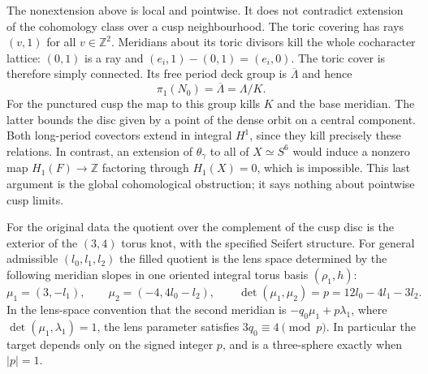 The nonextension above is local and pointwise.  It does not
contradict extension of the cohomology class over a cusp
neighbourhood.  The toric covering has rays $(v,1)$ for all
$v\in\mathbb Z^2$.  Meridians about its toric divisors kill
the whole cocharacter lattice: $(0,1)$ is a ray and
$(e_i,1)-(0,1)=(e_i,0)$.  The toric cover is therefore simply
connected.  Its free period deck group is $\overline\Lambda$
and hence
\[
 \pi_1(N_0)=\overline\Lambda=\Lambda/K.
 \label{mapsI:quotient-eq-5}
\]
For the punctured cusp the map to this group kills $K$ and
the base meridian.  The latter bounds the disc given by a
point of the dense orbit on a central component.  Both
long-period covectors extend in integral $H^1$, since they
kill precisely these relations.  In contrast, an extension
of $\theta_\gamma$ to all of $X\simeq S^6$ would induce a
nonzero map $H_1(F)\to\mathbb Z$ factoring through
$H_1(X)=0$, which is impossible.  This last argument is the
global cohomological obstruction; it says nothing about
pointwise cusp limits.

\begin{proposition}\label{mapsI:src:A.1.3}
For the original data the quotient over the complement of
the cusp disc is the exterior of the $(3,4)$ torus knot,
with the specified Seifert structure.  For general admissible
$(l_0,l_1,l_2)$ the filled quotient is the lens space determined
by the following meridian slopes in one oriented integral
torus basis $(\rho_1,h)$:
\[
 \mu_1=(3,-l_1),\qquad
 \mu_2=(-4,4l_0-l_2),\qquad
 \det(\mu_1,\mu_2)=p=12l_0-4l_1-3l_2.
 \label{mapsI:quotient-eq-6}
\]
In the lens-space convention that the second meridian is
$-q_0\mu_1+p\lambda_1$, where
$\det(\mu_1,\lambda_1)=1$, the lens parameter satisfies
$3q_0\equiv4\pmod p$.  In particular the target depends only
on the signed integer $p$, and is a three-sphere exactly
when $|p|=1$.
\end{proposition}


